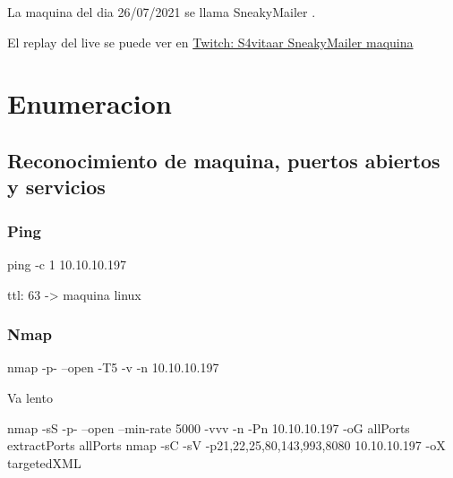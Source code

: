 \documentclass{assets/ipesethesis}
\newenvironment{Shaded}{\begin{snugshade}}{\end{snugshade}}
\newcommand{\ExtensionTok}[1]{#1}
\newcommand{\FunctionTok}[1]{\textcolor[rgb]{0.00,0.00,0.00}{#1}}
\newcommand{\NormalTok}[1]{#1}
\begin{document}
La maquina del dia 26/07/2021 se llama SneakyMailer
.

El replay del live se puede ver en \href{https://www.twitch.tv/videos/1098850596}{Twitch: S4vitaar SneakyMailer maquina}

\hypertarget{enumeracion-4}{%
\section*{Enumeracion}\label{enumeracion-4}}

\hypertarget{reconocimiento-de-maquina-puertos-abiertos-y-servicios-4}{%
\subsection*{Reconocimiento de maquina, puertos abiertos y servicios}\label{reconocimiento-de-maquina-puertos-abiertos-y-servicios-4}}

\hypertarget{ping-4}{%
\subsubsection*{Ping}\label{ping-4}}

\begin{Shaded}
\begin{Highlighting}[]
\FunctionTok{ping}\NormalTok{ -c 1 10.10.10.197}
\end{Highlighting}
\end{Shaded}

ttl: 63 -\textgreater{} maquina linux

\hypertarget{nmap-4}{%
\subsubsection*{Nmap}\label{nmap-4}}

\begin{Shaded}
\begin{Highlighting}[]
\FunctionTok{nmap}\NormalTok{ -p- --open -T5 -v -n 10.10.10.197 }
\end{Highlighting}
\end{Shaded}

Va lento

\begin{Shaded}
\begin{Highlighting}[]
\FunctionTok{nmap}\NormalTok{ -sS -p- --open --min-rate 5000 -vvv -n -Pn 10.10.10.197 -oG allPorts }
\ExtensionTok{extractPorts}\NormalTok{ allPorts}
\FunctionTok{nmap}\NormalTok{ -sC -sV -p21,22,25,80,143,993,8080 10.10.10.197 -oX targetedXML}
\end{Highlighting}
\end{Shaded}
\end{document}
